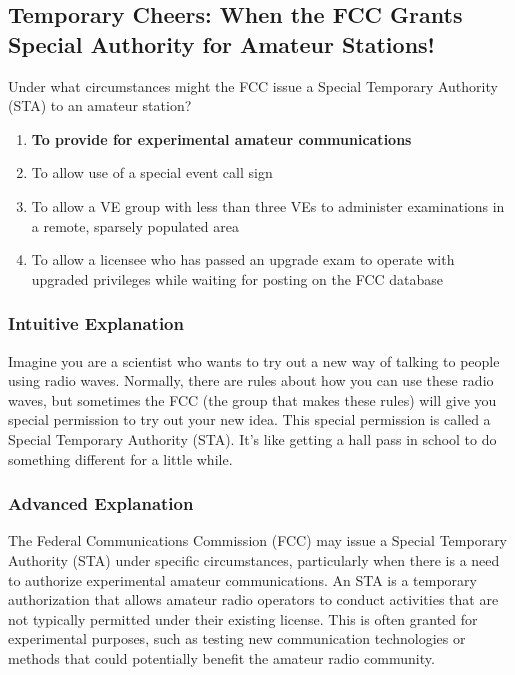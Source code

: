 \subsection{Temporary Cheers: When the FCC Grants Special Authority for Amateur Stations!}

\begin{tcolorbox}[colback=gray!10!white,colframe=black!75!black,title=E1F06] Under what circumstances might the FCC issue a Special Temporary Authority (STA) to an amateur station?
    \begin{enumerate}[label=\Alph*.]
        \item \textbf{To provide for experimental amateur communications}
        \item To allow use of a special event call sign
        \item To allow a VE group with less than three VEs to administer examinations in a remote, sparsely populated area
        \item To allow a licensee who has passed an upgrade exam to operate with upgraded privileges while waiting for posting on the FCC database
    \end{enumerate}
\end{tcolorbox}

\subsubsection{Intuitive Explanation}
Imagine you are a scientist who wants to try out a new way of talking to people using radio waves. Normally, there are rules about how you can use these radio waves, but sometimes the FCC (the group that makes these rules) will give you special permission to try out your new idea. This special permission is called a Special Temporary Authority (STA). It’s like getting a hall pass in school to do something different for a little while.

\subsubsection{Advanced Explanation}
The Federal Communications Commission (FCC) may issue a Special Temporary Authority (STA) under specific circumstances, particularly when there is a need to authorize experimental amateur communications. An STA is a temporary authorization that allows amateur radio operators to conduct activities that are not typically permitted under their existing license. This is often granted for experimental purposes, such as testing new communication technologies or methods that could potentially benefit the amateur radio community.

